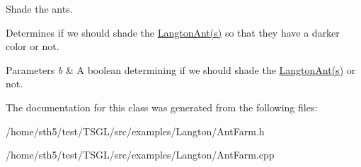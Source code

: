 Shade the ants. 

Determines if we should shade the \hyperlink{class_langton_ant}{Langton\+Ant(s)} so that they have a darker color or not. 
\begin{DoxyParams}{Parameters}
{\em b} & A boolean determining if we should shade the \hyperlink{class_langton_ant}{Langton\+Ant(s)} or not. \\
\hline
\end{DoxyParams}


The documentation for this class was generated from the following files\+:\begin{DoxyCompactItemize}
\item 
/home/sth5/test/\+T\+S\+G\+L/src/examples/\+Langton/Ant\+Farm.\+h\item 
/home/sth5/test/\+T\+S\+G\+L/src/examples/\+Langton/Ant\+Farm.\+cpp\end{DoxyCompactItemize}
